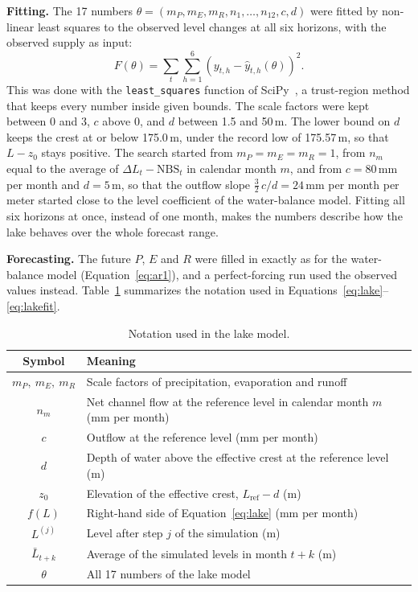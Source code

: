 \documentclass{article}
\begin{document}
\textbf{Fitting.} The 17 numbers $\theta = (m_P, m_E, m_R, n_1, \dots, n_{12}, c, d)$ were fitted
by non-linear least squares to the observed level changes at all six horizons, with the observed
supply as input:
\begin{equation}
F(\theta) = \sum_{t} \sum_{h=1}^{6} \left( y_{t,h} - \hat y_{t,h}(\theta) \right)^2.
\label{eq:lakefit}
\end{equation}
This was done with the \texttt{least\_squares} function of SciPy~\cite{scipy}, a trust-region
method that keeps every number inside given bounds. The scale factors were kept between 0 and 3,
$c$ above 0, and $d$ between 1.5 and 50\,m. The lower bound on $d$ keeps the crest at or below
175.0\,m, under the record low of 175.57\,m, so that $L - z_0$ stays positive. The search started
from $m_P = m_E = m_R = 1$, from $n_m$ equal to the average of $\Delta L_t - \mathrm{NBS}_t$ in
calendar month $m$, and from $c = 80$\,mm per month and $d = 5$\,m, so that the outflow slope
$\tfrac{3}{2}\,c/d = 24$\,mm per month per meter started close to the level coefficient of the
water-balance model. Fitting all six horizons at once, instead of one month, makes the numbers
describe how the lake behaves over the whole forecast range.

\textbf{Forecasting.} The future $P$, $E$ and $R$ were filled in exactly as for the water-balance
model (Equation~\ref{eq:ar1}), and a perfect-forcing run used the observed values instead.
Table~\ref{tab:notation-lake} summarizes the notation used in
Equations~\ref{eq:lake}--\ref{eq:lakefit}.

\begin{table}[htbp]
\centering
\caption{Notation used in the lake model.}
\label{tab:notation-lake}
\begin{tabular}{||c|l||}
\hline\hline
Symbol & Meaning \\
\hline\hline
$m_P,\ m_E,\ m_R$ & Scale factors of precipitation, evaporation and runoff \\
$n_m$ & Net channel flow at the reference level in calendar month $m$ (mm per month) \\
$c$ & Outflow at the reference level (mm per month) \\
$d$ & Depth of water above the effective crest at the reference level (m) \\
$z_0$ & Elevation of the effective crest, $L_{\mathrm{ref}} - d$ (m) \\
$f(L)$ & Right-hand side of Equation~\ref{eq:lake} (mm per month) \\
$L^{(j)}$ & Level after step $j$ of the simulation (m) \\
$\bar L_{t+k}$ & Average of the simulated levels in month $t+k$ (m) \\
$\theta$ & All 17 numbers of the lake model \\
\hline\hline
\end{tabular}
\end{table}
\end{document}
